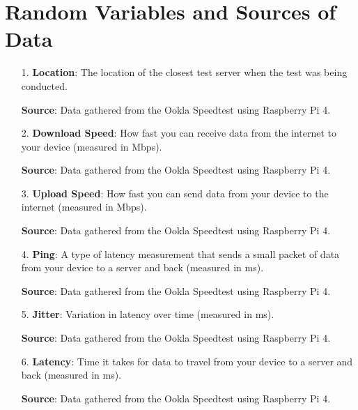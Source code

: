 \documentclass[conference]{IEEEtran}
\begin{document}
\section{Random Variables and Sources of Data}
\begin{enumerate}
    \item[1.]
    \textbf{Location}:
    The location of the closest test server when the test was being conducted.

    \textbf{Source}: Data gathered from the Ookla Speedtest using Raspberry Pi 4. 
    \item[2.]    
    \textbf{Download Speed}: 
    How fast you can receive data from the internet to your device (measured in Mbps).

    \textbf{Source}: Data gathered from the Ookla Speedtest using Raspberry Pi 4. 
    \item[3.]
    \textbf{Upload Speed}:
    How fast you can send data from your device to the internet (measured in Mbps). 
    
    \textbf{Source}: Data gathered from the Ookla Speedtest using Raspberry Pi 4. 
    \item[4.]
    \textbf{Ping}: 
    A type of latency measurement that sends a small packet of data from your device to a server and back (measured in ms).

    \textbf{Source}: Data gathered from the Ookla Speedtest using Raspberry Pi 4. 
    \item[5.] 
    \textbf{Jitter}: 
    Variation in latency over time (measured in ms).

    \textbf{Source}: Data gathered from the Ookla Speedtest using Raspberry Pi 4. 
    \item[6.] 
    \textbf{Latency}: 
    Time it takes for data to travel from your device to a server and back (measured in ms).

    \textbf{Source}: Data gathered from the Ookla Speedtest using Raspberry Pi 4. 
\end{enumerate}

\end{document}
